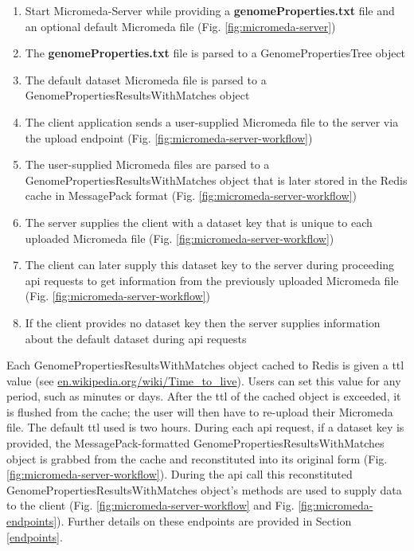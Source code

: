 \begin{enumerate}
  \item Start Micromeda-Server while providing a \textbf{genomeProperties.txt} 
file and an optional default Micromeda file (Fig. \ref{fig:micromeda-server})
  \item The \textbf{genomeProperties.txt} file is parsed to a 
GenomePropertiesTree object
  \item The default dataset Micromeda file is parsed to a 
GenomePropertiesResultsWithMatches object  
  \item The client application sends a user-supplied Micromeda file to the 
server via the upload endpoint (Fig. \ref{fig:micromeda-server-workflow})
  \item The user-supplied Micromeda files are parsed to a 
GenomePropertiesResultsWithMatches object that is later stored in the Redis 
cache in MessagePack format (Fig. \ref{fig:micromeda-server-workflow})
  \item The server supplies the client with a dataset key that is unique to each 
uploaded Micromeda file (Fig. \ref{fig:micromeda-server-workflow})
  \item The client can later supply this dataset key to the server during 
proceeding \gls{api} requests to get information from the previously uploaded 
Micromeda file (Fig. \ref{fig:micromeda-server-workflow})
  \item If the client provides no dataset key then the server supplies 
information about the default dataset during \gls{api} requests
\end{enumerate}

Each GenomePropertiesResultsWithMatches object cached to Redis is given a 
\gls{ttl} value \cite{gwertzman1996world} (see 
\href{http://en.wikipedia.org/wiki/Time_to_live}{en.wikipedia.org/wiki/Time\_to\_live}). 
Users can set this value for any period, such as minutes or days. After the 
\gls{ttl} of the cached object is exceeded, it is flushed from the cache; the 
user will then have to re-upload their Micromeda file. The default \gls{ttl} 
used is two hours. During each \gls{api} request, if a dataset key is provided, 
the MessagePack-formatted GenomePropertiesResultsWithMatches object is grabbed 
from the cache and reconstituted into its original form (Fig. 
\ref{fig:micromeda-server-workflow}). During the \gls{api} call this 
reconstituted GenomePropertiesResultsWithMatches object's methods are used to 
supply data to the client  (Fig. \ref{fig:micromeda-server-workflow} and Fig. 
\ref{fig:micromeda-endpoints}). Further details on these endpoints are provided 
in Section \ref{endpoints}.

